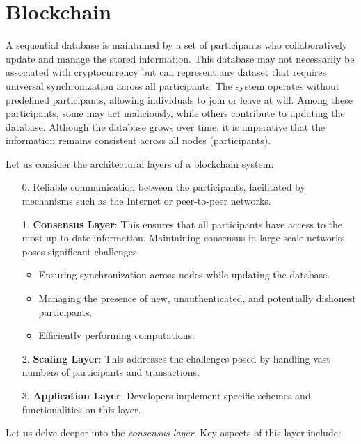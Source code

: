 
\section{Blockchain}

A sequential database is maintained by a set of participants who collaboratively update and manage the stored information. 
This database may not necessarily be associated with cryptocurrency but can represent any dataset that requires universal synchronization across all participants. 
The system operates without predefined participants, allowing individuals to join or leave at will. 
Among these participants, some may act maliciously, while others contribute to updating the database. 
Although the database grows over time, it is imperative that the information remains consistent across all nodes (participants).

Let us consider the architectural layers of a blockchain system:

\begin{itemize}
    \item[0.] Reliable communication between the participants, facilitated by mechanisms such as the Internet or peer-to-peer networks.
    \item[1.] \textbf{Consensus Layer}: This ensures that all participants have access to the most up-to-date information. Maintaining consensus in large-scale networks poses significant challenges.
	\begin{itemize}
	    \item Ensuring synchronization across nodes while updating the database.
	    \item Managing the presence of new, unauthenticated, and potentially dishonest participants.
	    \item Efficiently performing computations.
	\end{itemize}
    \item[2.] \textbf{Scaling Layer}: This addresses the challenges posed by handling vast numbers of participants and transactions.
    \item[3.] \textbf{Application Layer}: Developers implement specific schemes and functionalities on this layer.
\end{itemize}

Let us delve deeper into the \emph{consensus layer}. 
Key aspects of this layer include:

